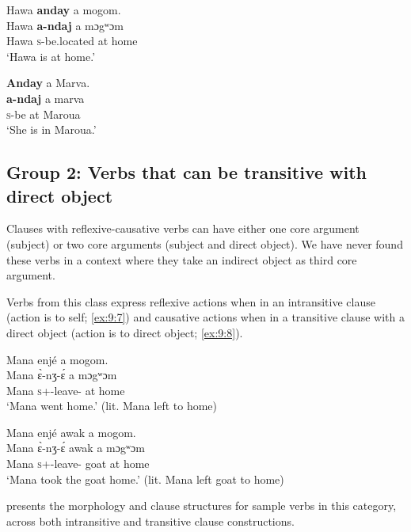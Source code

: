 \ea \label{ex:9:5}
Hawa  \textbf{anday} a  mogom.\\
\gll  Hawa \textbf{a-ndaj}    a  mɔgʷɔm\\
      Hawa  {\textsc{s}-be.located}  at  home\\
\glt  ‘Hawa is at home.’ 
\z

\ea \label{ex:9:6}
\textbf{Anday}  a  Marva.\\
\gll  \textbf{a-ndaj}   a   marva\\
      \textsc{s}-be  at  Maroua\\
\glt  ‘She is in Maroua.’
\z
{}
\subsection{Group 2: Verbs that can be transitive with direct object}\label{sec:9.2.2}

Clauses with reflexive-causative verbs can have either one core argument (subject) or two core arguments (subject and direct object). We have never found these verbs in a context where they take an indirect object as third core argument. 

Verbs from this class express reflexive actions when in an intransitive clause (action is to self; \ref{ex:9:7}) and causative actions when in a transitive clause with a direct object (action is to direct object; \ref{ex:9:8}). 

\ea \label{ex:9:7}
Mana  enjé  a  mogom. \\
\gll  Mana   \`{ɛ}-nʒ-\'{ɛ}     a   mɔgʷɔm \\
      Mana  \textsc{s}+{\PFV}-leave-{\CL}  at  home\\
\glt  ‘Mana went home.’ (lit. Mana left to home)  
\z

\ea \label{ex:9:8}
Mana  enjé  awak  a  mogom. \\
\gll  Mana   \`{ɛ}-nʒ-\'{ɛ}     awak   a   mɔgʷɔm\\
      Mana  \textsc{s}+{\PFV}-leave-{\CL}  goat  at  home\\
\glt  ‘Mana took the goat home.’ (lit. Mana left goat to home) 
\z

 presents the morphology and clause structures for sample verbs in this category, across both intransitive and transitive clause constructions.

